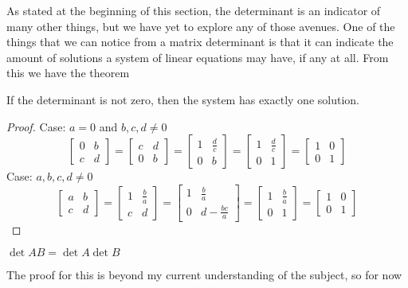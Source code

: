 As stated at the beginning of this section, the determinant is an indicator of
many other things, but we have yet to explore any of those avenues. One of the
things that we can notice from a matrix determinant is that it can indicate the
amount of solutions a system of linear equations may have, if any at all. From
this we have the theorem
\begin{theorem}
    If the determinant is not zero, then the system has exactly one solution.
\end{theorem}
\begin{proof}
    Case: $a = 0$ and $b,c,d \neq 0$
    \begin{equation*}
        \begin{bmatrix}
            0 & b \\
            c & d
        \end{bmatrix}
        = \begin{bmatrix}
            c & d \\
            0 & b 
        \end{bmatrix}
        = \begin{bmatrix}
            1 & \frac{d}{c} \\
            0 & b 
        \end{bmatrix}
        = \begin{bmatrix}
            1 & \frac{d}{c} \\
            0 & 1  
        \end{bmatrix}
        = \begin{bmatrix}
            1 & 0 \\
            0 & 1 
        \end{bmatrix}
    \end{equation*}
    Case: $a,b,c,d \neq 0$
    \begin{equation*}
        \begin{bmatrix}
            a & b \\
            c & d
        \end{bmatrix}
        = \begin{bmatrix}
            1 & \frac{b}{a} \\
            c & d 
        \end{bmatrix}
        = \begin{bmatrix}
            1 & \frac{b}{a} \\
            0 & d-\frac{bc}{a}
        \end{bmatrix}
        = \begin{bmatrix}
            1 & \frac{b}{a} \\
            0 & 1  
        \end{bmatrix}
        = \begin{bmatrix}
            1 & 0 \\
            0 & 1 
        \end{bmatrix}
    \end{equation*}
\end{proof}

\begin{theorem}
    $\det{AB}=\det{A}\det{B}$
\end{theorem}
The proof for this is beyond my current understanding of the subject, so for now
